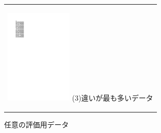 \begin{figure}[htbp]
\begin{center}
\begin{tabular}{c}
      \begin{minipage}{0.33\hsize}
        \begin{center}
          \includegraphics[clip, width=3.2cm]{./lebel3-3figs/eva1-5.pdf}
          \hspace{2.3cm} (3)違いが最も多いデータ
        \end{center}
      \end{minipage}

    \end{tabular}
    \caption{任意の評価用データ}
  \end{center}
\end{figure}

